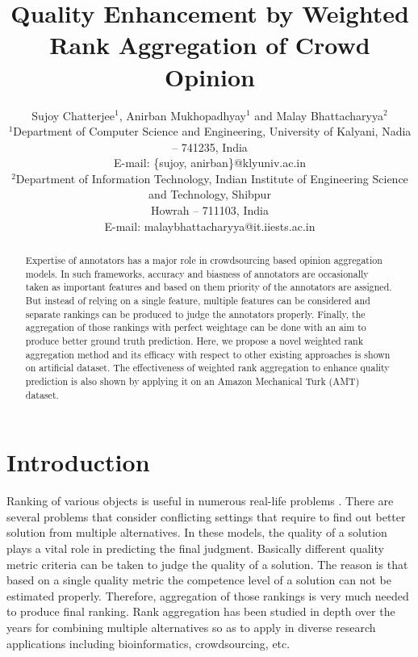 \documentclass[letterpaper]{article}
\begin{document}
%
\title{Quality Enhancement by Weighted Rank Aggregation of Crowd Opinion}
\author{Sujoy Chatterjee$^1$, Anirban Mukhopadhyay$^1$ and Malay Bhattacharyya$^2$\\
$^1$Department of Computer Science and Engineering, University of Kalyani, Nadia -- 741235, India\\
E-mail: \{sujoy, anirban\}@klyuniv.ac.in\\
$^2$Department of Information Technology, Indian Institute of Engineering Science and Technology, Shibpur\\ Howrah -- 711103, India\\
E-mail: malaybhattacharyya@it.iiests.ac.in\\
}
\maketitle




\begin{abstract}
Expertise of annotators has a major role in crowdsourcing based opinion aggregation models. In such frameworks, accuracy and biasness of annotators are occasionally taken as important features and based on them priority of the annotators are assigned. But instead of relying on a single feature, multiple features can be considered and separate rankings can be produced to judge the annotators properly. Finally, the aggregation of those rankings with perfect weightage can be done with an aim to produce better ground truth prediction. Here, we propose a novel weighted rank aggregation method and its efficacy with respect to other existing approaches is shown on artificial dataset. The effectiveness of weighted rank aggregation to enhance quality prediction is also shown by applying it on an Amazon Mechanical Turk (AMT) dataset.
\end{abstract}




\section{Introduction}
Ranking of various objects is useful in numerous real-life problems \cite{Dwork2001,DeConde2006}. There are several problems that consider conflicting settings that require to find out better solution from multiple alternatives. In these models, the quality of a solution plays a vital role in predicting the final judgment. Basically different quality metric criteria can be taken to judge the quality of a solution. The reason is that based on a single quality metric the competence level of a solution can not be estimated properly. Therefore, aggregation of those rankings is very much needed to produce final ranking. Rank aggregation \cite{DeConde2006,Dwork2001,Stuart03,Kolde2012,Chen:2013:PRA:2433396.2433420} has been studied in depth over the years for combining multiple alternatives so as to apply in diverse research applications including bioinformatics, crowdsourcing, etc.
\end{document}
